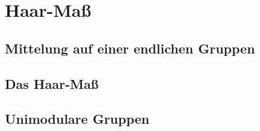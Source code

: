 %
%
%
\section{Haar-Maß
\label{buch:gruppen:section:haar}}

%
%
\subsection{Mittelung auf einer endlichen Gruppen
\label{buch:haar:subsection:endlich}}

%
%
\subsection{Das Haar-Maß
\label{buch:haar:subsection:haar}}

%
%
\subsection{Unimodulare Gruppen
\label{buch:haar:subsection:unimodular}}
